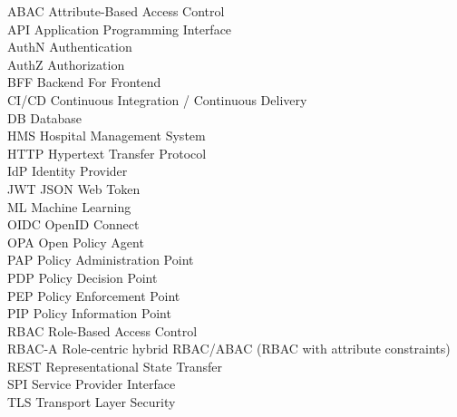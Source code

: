 ABAC \dotfill Attribute-Based Access Control \\
API \dotfill Application Programming Interface \\
AuthN \dotfill Authentication \\
AuthZ \dotfill Authorization \\
BFF \dotfill Backend For Frontend \\
CI/CD \dotfill Continuous Integration / Continuous Delivery \\
DB \dotfill Database \\
HMS \dotfill Hospital Management System \\
HTTP \dotfill Hypertext Transfer Protocol \\
IdP \dotfill Identity Provider \\
JWT \dotfill JSON Web Token \\
ML \dotfill Machine Learning \\
OIDC \dotfill OpenID Connect \\
OPA \dotfill Open Policy Agent \\
PAP \dotfill Policy Administration Point \\
PDP \dotfill Policy Decision Point \\
PEP \dotfill Policy Enforcement Point \\
PIP \dotfill Policy Information Point \\
RBAC \dotfill Role-Based Access Control \\
RBAC-A \dotfill Role-centric hybrid RBAC/ABAC (RBAC with attribute constraints) \\
REST \dotfill Representational State Transfer \\
SPI \dotfill Service Provider Interface \\
TLS \dotfill Transport Layer Security \\
